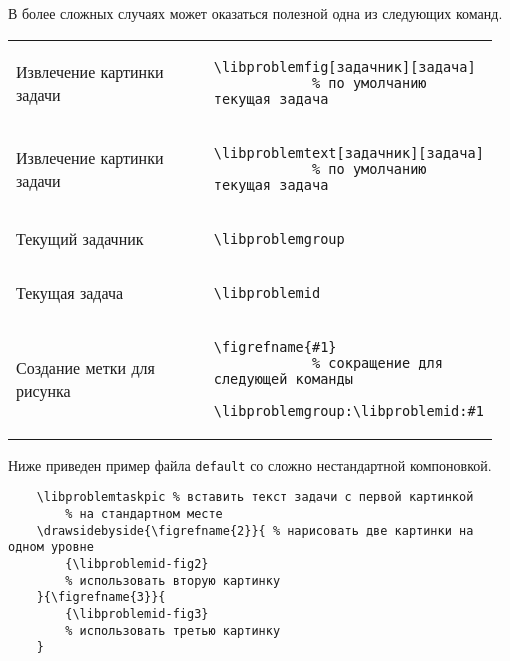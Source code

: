 В более сложных случаях может оказаться полезной одна из следующих команд.

\noindent
\begin{tabular}{S{0.48\linewidth} S{0.485\linewidth}}
    Извлечение картинки задачи &
        \begin{lstlisting}[style = listtable, gobble = 10]
            \libproblemfig[задачник][задача]
            % по умолчанию текущая задача
        \end{lstlisting} \\
    Извлечение картинки задачи &
        \begin{lstlisting}[style = listtable, gobble = 10]
            \libproblemtext[задачник][задача]
            % по умолчанию текущая задача
        \end{lstlisting} \\
    Текущий задачник &
        \begin{lstlisting}[style = listtable, gobble = 10]
            \libproblemgroup
        \end{lstlisting} \\
    Текущая задача &
        \begin{lstlisting}[style = listtable, gobble = 10]
            \libproblemid
        \end{lstlisting} \\
    Создание метки для рисунка &
        \begin{lstlisting}[style = listtable, gobble = 10]
            \figrefname{#1}
            % сокращение для следующей команды
            \libproblemgroup:\libproblemid:#1
        \end{lstlisting} \\
\end{tabular}

Ниже приведен пример файла \texttt{default} со сложно нестандартной компоновкой.

\begin{lstlisting}
    \libproblemtaskpic % вставить текст задачи с первой картинкой
        % на стандартном месте
    \drawsidebyside{\figrefname{2}}{ % нарисовать две картинки на одном уровне
        {\libproblemid-fig2}
        % использовать вторую картинку
    }{\figrefname{3}}{
        {\libproblemid-fig3}
        % использовать третью картинку
    }
\end{lstlisting}